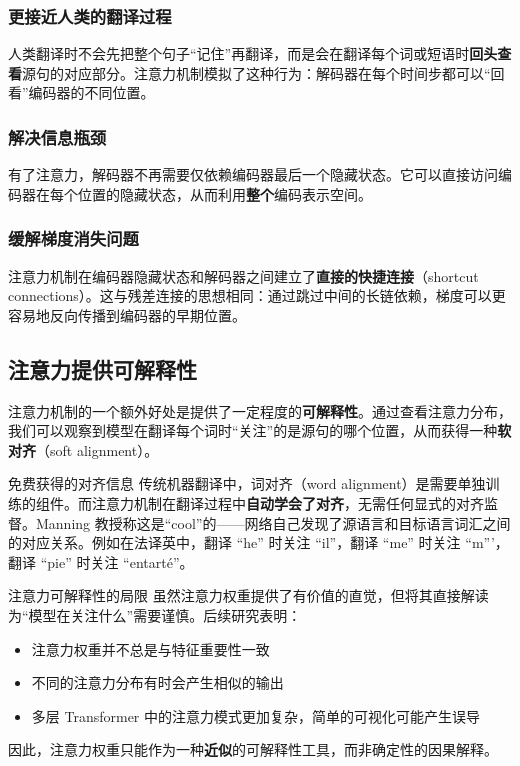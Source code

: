 \documentclass[a4paper]{article}
\begin{document}
\subsubsection{更接近人类的翻译过程}

人类翻译时不会先把整个句子``记住''再翻译，而是会在翻译每个词或短语时\textbf{回头查看}源句的对应部分。注意力机制模拟了这种行为：解码器在每个时间步都可以``回看''编码器的不同位置。

\subsubsection{解决信息瓶颈}

有了注意力，解码器不再需要仅依赖编码器最后一个隐藏状态。它可以直接访问编码器在每个位置的隐藏状态，从而利用\textbf{整个}编码表示空间。

\subsubsection{缓解梯度消失问题}

注意力机制在编码器隐藏状态和解码器之间建立了\textbf{直接的快捷连接}（shortcut connections）。这与残差连接的思想相同：通过跳过中间的长链依赖，梯度可以更容易地反向传播到编码器的早期位置。

\subsection{注意力提供可解释性}

注意力机制的一个额外好处是提供了一定程度的\textbf{可解释性}。通过查看注意力分布，我们可以观察到模型在翻译每个词时``关注''的是源句的哪个位置，从而获得一种\textbf{软对齐}（soft alignment）。

\begin{knowledgebox}{免费获得的对齐信息}
传统机器翻译中，词对齐（word alignment）是需要单独训练的组件。而注意力机制在翻译过程中\textbf{自动学会了对齐}，无需任何显式的对齐监督。Manning 教授称这是``cool''的——网络自己发现了源语言和目标语言词汇之间的对应关系。例如在法译英中，翻译 ``he'' 时关注 ``il''，翻译 ``me'' 时关注 ``m'''，翻译 ``pie'' 时关注 ``entart\'{e}''。
\end{knowledgebox}

\begin{warningbox}{注意力可解释性的局限}
虽然注意力权重提供了有价值的直觉，但将其直接解读为``模型在关注什么''需要谨慎。后续研究表明：
\begin{itemize}
    \item 注意力权重并不总是与特征重要性一致
    \item 不同的注意力分布有时会产生相似的输出
    \item 多层 Transformer 中的注意力模式更加复杂，简单的可视化可能产生误导
\end{itemize}
因此，注意力权重只能作为一种\textbf{近似}的可解释性工具，而非确定性的因果解释。
\end{warningbox}
\end{document}
